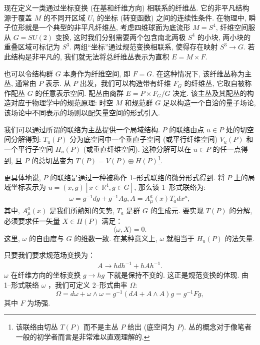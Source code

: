 \documentclass{article}
\begin{document}
现在定义一类通过坐标变换 (在基和纤维方向) 相联系的纤维丛. 它的非平凡结构源于覆盖 $M$ 的不同开区域 $U_{i}$ 的坐标 (转变函数) 之间的连续性条件. 在物理中, 瞬子位形就是一个典型的非平凡纤维丛, 考虑四维球面为底流形 $M = S^{4}$, 纤维空间服从 $G = SU(2)$ 变换, 这时我们分别需要两个包含南北两极 $S^{4}$ 的小块, 两小块的重叠区域可标记为 $S^{3}$. 两组“坐标”通过规范变换相联系, 使得存在映射 $S^{3}\rightarrow G$. 若此结构是非平凡的, 我们就无法将总纤维丛表示为直积 $E = M\times F$.

\par 也可以令结构群 $G$ 本身作为纤维空间, 即 $F = G$. 在这种情况下, 该纤维丛称为主丛, 通常由 $P$ 表示. 从 $P$ 出发，我们可以构造带有纤维 $F_{G}$ 的纤维丛, 它取自被称作配丛 $G$ 的任意表示空间. 配丛由商群 $E = P\times F_{G}/G$ 决定. 该主丛及其配丛的构造对应于物理学中的规范原理: 时空 $M$ 和规范群 $G$ 足以构造一个自洽的量子场论, 该场论中不同表示的场则以配矢量空间的形式引入.

\par 我们可以通过所谓的联络为主丛提供一个局域结构. $P$ 的联络由点 $u \in P$ 处的切空间分解得到: $T_{u}(P)$ 分为底空间中一个垂直子空间 (或平行纤维空间) $V_{u}(P)$ 和一个平行子空间 $H_{u}(P)$ (或垂直纤维空间). 这种分解可以在 $u\in P$ 的任一点得到, 且 $P$ 的总切丛变为 $T(P)= V(P)\oplus H(P)$\footnote{该联络由切丛 $T(P)$ 而不是主丛 $P$ 给出 (底空间为 $P$). 丛的概念对于像笔者一般的初学者而言是非常难以直观理解的.}.

\par 更具体地说, $P$ 的联络是通过一种被称作 1--形式联络的微分形式得到. 将 $P$ 上的局域坐标表示为 $u =(x, g)[x\in \mathbb{R}^{4}, g\in G]$, 那么该 1--形式联络为:
\begin{align}
\omega = g^{-1}dg+g^{-1}Ag, A=A_{\mu}^{a}(x)T_{a}dx^{\mu},
\end{align}
其中, $A_{\mu}^{a}(x)$ 是我们所熟知的矢势, $T_{a}$ 是群 $G$ 的生成元. 要实现 $T(P)$ 的分解, 必须要求任一矢量 $X \in H(P)$ 满足：
\begin{equation}
\langle \omega, X\rangle=0.
\end{equation}
这里, $\omega$ 的自由度与 $G$ 的维数一致. 在某种意义上, $\omega$ 就相当于 $H_{u}(P)$ 的法矢量.

\par 只要我们要求规范场变换为：
\begin{align}
A \rightarrow hdh^{-1}+hAh^{-1}.
\end{align}
$\omega$ 在纤维方向的坐标变换 $g \rightarrow hg$ 下就是保持不变的. 这正是规范变换的体现. 由 1--形式联络 $\omega$ ，我们可定义 2--形式曲率 $\Omega$:
\begin{equation}
\Omega=d\omega+\omega\wedge \omega=g^{-1}(dA+A\wedge A)g=g^{-1}Fg,
\end{equation}
其中 $F$ 为场强.
\end{document}
